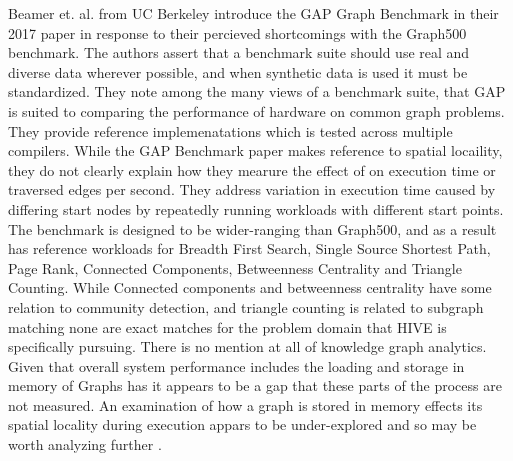 \documentclass[sigconf,anonymous, authordraft]{acmart}
\begin{document}
\par{Beamer et. al. from UC Berkeley introduce the GAP Graph Benchmark in their 2017 paper in response to their percieved shortcomings with the Graph500 benchmark. 
The authors assert that a benchmark suite should use real and diverse data wherever possible, and when synthetic data is used it must be standardized. 
They note among the many views of a benchmark suite, that GAP is suited to comparing the performance of hardware on common graph problems.
They provide reference implemenatations which is tested across multiple compilers. 
While the GAP Benchmark paper makes reference to spatial locaility, they do not clearly explain how they mearure the effect of on execution time or traversed edges per second. 
They address variation in execution time caused by differing start nodes by repeatedly running workloads with different start points. 
The benchmark is designed to be wider-ranging than Graph500, and as a result has reference workloads for Breadth First Search, Single Source Shortest Path, Page Rank, Connected Components, Betweenness Centrality and Triangle Counting. 
While Connected components and betweenness centrality have some relation to community detection, and triangle counting is related to subgraph matching none are exact matches for the problem domain that HIVE is specifically pursuing. 
There is no mention at all of knowledge graph analytics. Given that overall system performance includes the loading and storage in memory of Graphs has it appears to be a gap that these parts of the process are not measured. 
An examination of how a graph is stored in memory effects its spatial locality during execution appars to be under-explored and so may be worth analyzing further \cite{Beamer2017}.}
\small
\end{document}
